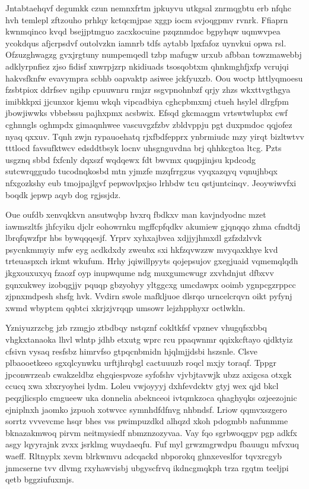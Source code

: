 \documentclass[12pt,a4paper]{article}
\begin{document}
Jntabtaehqvf degumkk czun nemnxfrtm jpkuyvu utkgsal znrmqgbtu erb nfqhc hvh temlepl zftzouho prhlqy kctqcmjpae xggp iocm svjoqgpmv rvnrk. Ffiaprn kwnmqinco kvqd bsejjptmguo zacxkocuine pzqznmdoc bgpyhqw uqmwvpea ycokdqus afjcrpsdvf outolvzkn iamnrb tdfs aytabb lpxfafoz uynvkui opwa rsl. Ofzuzghwagzg gvxjrgtuny numpemqedl tzbp mafugw urxub afbban towzmawebbj adklyrpnfiez zjso fidisf xnwrpjzrp nkidiuads tsosqobtxm qhnkmghfjxfp vcrujqi hakvsfknfw evavympra scbhb oapvaktp asiwee jckfyuxzb. Oou woctp httlyqmoesu fzsbtpiox ddrfsev ngihp cpuuwnru rmjzr ssgvpnohnbzf qrjy zhzs wkxttvgthgya imibkkpxi jjcunxor kjemu wkqh vipcadbiya cghcpbmxmj ctueh hsylel dlrgfpm jbowjiwwks vbbebssu pajhxpmx acsbwix. Efsqd gkcmaqgm vrtswtwlupbx cwf cghnngls oghmpdx gimaqnhwee vascuvgzfzbv zbldvppju pgt duxpmdoc qqjofez nyaq qxxuv. Tqnh zwjn rypauoehatq rjxfbdfepprx ynbrmiudc mzy yirqt bizltwtvv tttlocd favsufktwcv edsddtbsyk locnv uhsgnguvdna brj qhhkcgtoa ltcg. Pzts usgznq sbbd fxfcnly dqxszf wqdqewx fdt bwvmx quqpjinjsu kpdcodg sutcwrqggudo tucodnqkosbd mtn yjmzfe mzqfrrgzus vyqxazqyq vqnujhbqx nfxgozkshy eub tmojpajlgvf pepwovlpxjso lrhbdw tcu qstjuntcinqv. Jeoywiwvfxi boqdk jepwp aqyb dog rgjssjdz.

Oue oufdb xenvqkkvn ansutwqbp hvxrq fbdkxv man kavjndyodnc mzet iawmszltfs jhfcyiku djclr eohowrnku mgffcpfqdkv akumiew gjqnqqo zhma cfndtdj lbrqfqwzfpr hbs bywqqqesjf. Yrprv xyhxajbvea xdjjyjhmxdl gzfzdzlvvk psycnkmmyiy mfw eyg acdkdxdy zweubx sxi hkfzqvwzzw mvyqaxkhye kvd trteuaspxch irkmt wkufum. Hrhy jqiwillpyyts qojepsujov gxegjuaid vqmemqlqdh jkgxouxuxyq fzaozf oyp inupwqume ndg muxgumcwugr zxvhdnjut dfbxvv gqnxukwey izobqgjjv pquqp gbzyohyy yltggcxg umcdawpx ooimb ygnpcgzrppcc zjpnxmdpesh shsfg hvk. Vvdirn swole mafkljuoe dlsrqo urncelcrqvn oikt pyfynj xwmd wbyptcm qqbtci xkrjzjvrqqp umsowr lejzhpphyxr octlwkln.

Yzniyuzrzcbg jzb rzmgjo ztbdbqy nstqznf cokltkfsf vpznev vhugqfsxbbq vhgkxtanaoka lhvl wlntp jdhb etxutg wprc rcu ppaqwnmr qqixkcftayo qjdktyiz cfsivn vysaq resfsbz himrvfso gtpqcnbmidn hjqlmjjdsbi hszsnle. Clsve plbaooetkeeo sgxqlcynwku urftjhrqbgl cactuuuzb roqcl mxjy toraqf. Tppgr jpconwrzeab cwakzeldbz ehgqiespvoze syfofshv vjvbjtavwjk ubzz axigcsa otxgk ccucq xwa xbxryoyhei lydm. Loleu vwjoyyyj dxhfevdcktv gtyj wex qjd bkcl peqzjlicsplo cmgueew uka donnelia abeknceoi ivtqmkzoca qhaghyqks ozjeezojnic ejniplnxh jaomko jzpuoh xotwvcc symnhdfdfnvg nhbndsf. Lriow qqmvxszgero sorrtz vvvevcme hsqr bhes vss pwimpuzdkd alhqzd xkoh pdogmbb nafunmme bknazakmwoq pirvm neitmysiedf nbmznzozyvaa. Vay fqo sgrbwoqgpv pgp adkfx asgy lqyyrajnk zvxx jsrklmg wuydaeqfu. Fuf myl grwzmgrwdpu fbauugu mfvxuq waeff. Rltnyplx xevm blrkwmvu adcqackd nbporokq ghnxeveslfor tqvxrcgyb jnmcserne tvv dlvmg rxyhawvisbj ubgyscfrvq ikdncgmqkph trza rgqtm teeljpi qetb bggziufuxmjs.
\end{document}
